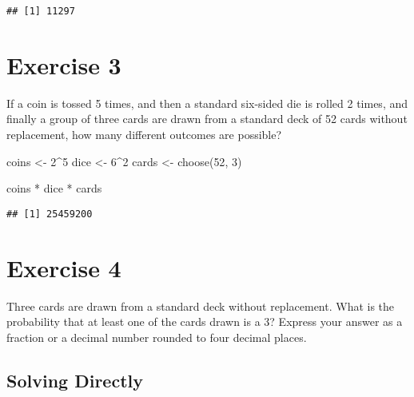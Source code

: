\documentclass[
]{article}
\newenvironment{Shaded}{\begin{snugshade}}{\end{snugshade}}
\newcommand{\DecValTok}[1]{\textcolor[rgb]{0.00,0.00,0.81}{#1}}
\newcommand{\FunctionTok}[1]{\textcolor[rgb]{0.00,0.00,0.00}{#1}}
\newcommand{\NormalTok}[1]{#1}
\newcommand{\OtherTok}[1]{\textcolor[rgb]{0.56,0.35,0.01}{#1}}
\newcommand{\SpecialCharTok}[1]{\textcolor[rgb]{0.00,0.00,0.00}{#1}}
\begin{document}
\begin{verbatim}
## [1] 11297
\end{verbatim}

\hypertarget{exercise-3}{%
\section{Exercise 3}\label{exercise-3}}

If a coin is tossed 5 times, and then a standard six-sided die is rolled
2 times, and finally a group of three cards are drawn from a standard
deck of 52 cards without replacement, how many different outcomes are
possible?

\begin{Shaded}
\begin{Highlighting}[]
\NormalTok{coins }\OtherTok{\textless{}{-}} \DecValTok{2}\SpecialCharTok{\^{}}\DecValTok{5}
\NormalTok{dice }\OtherTok{\textless{}{-}} \DecValTok{6}\SpecialCharTok{\^{}}\DecValTok{2}
\NormalTok{cards }\OtherTok{\textless{}{-}} \FunctionTok{choose}\NormalTok{(}\DecValTok{52}\NormalTok{, }\DecValTok{3}\NormalTok{)}

\NormalTok{coins }\SpecialCharTok{*}\NormalTok{ dice }\SpecialCharTok{*}\NormalTok{ cards}
\end{Highlighting}
\end{Shaded}

\begin{verbatim}
## [1] 25459200
\end{verbatim}

\hypertarget{exercise-4}{%
\section{Exercise 4}\label{exercise-4}}

Three cards are drawn from a standard deck without replacement. What is
the probability that at least one of the cards drawn is a 3? Express
your answer as a fraction or a decimal number rounded to four decimal
places.

\hypertarget{solving-directly}{%
\subsection{Solving Directly}\label{solving-directly}}
\end{document}
